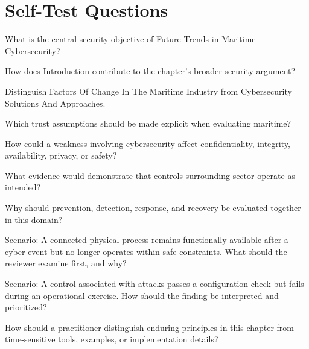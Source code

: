 \documentclass[11pt,letterpaper]{article}
\begin{document}
\section*{Self-Test Questions}
\begin{CornellRecallList}
\item What is the central security objective of Future Trends in Maritime Cybersecurity?
\item How does Introduction contribute to the chapter's broader security argument?
\item Distinguish Factors Of Change In The Maritime Industry from Cybersecurity Solutions And Approaches.
\item Which trust assumptions should be made explicit when evaluating maritime?
\item How could a weakness involving cybersecurity affect confidentiality, integrity, availability, privacy, or safety?
\item What evidence would demonstrate that controls surrounding sector operate as intended?
\item Why should prevention, detection, response, and recovery be evaluated together in this domain?
\item Scenario: A connected physical process remains functionally available after a cyber event but no longer operates within safe constraints. What should the reviewer examine first, and why?
\item Scenario: A control associated with attacks passes a configuration check but fails during an operational exercise. How should the finding be interpreted and prioritized?
\item How should a practitioner distinguish enduring principles in this chapter from time-sensitive tools, examples, or implementation details?
\end{CornellRecallList}
\end{document}
